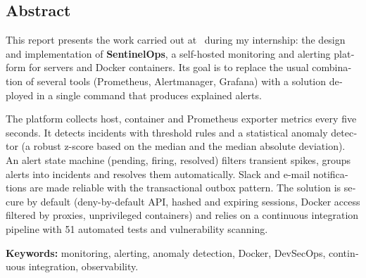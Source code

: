 \vspace{0.3cm}
\begin{otherlanguage}{english}
\section*{Abstract}
This report presents the work carried out at \entreprise\ during my internship: the design
and implementation of \textbf{SentinelOps}, a self-hosted monitoring and alerting platform for
servers and Docker containers. Its goal is to replace the usual combination of several tools
(Prometheus, Alertmanager, Grafana) with a solution deployed in a single command that
produces explained alerts.

The platform collects host, container and Prometheus exporter metrics every five seconds. It
detects incidents with threshold rules and a statistical anomaly detector (a robust z-score
based on the median and the median absolute deviation). An alert state machine (pending,
firing, resolved) filters transient spikes, groups alerts into incidents and resolves them
automatically. Slack and e-mail notifications are made reliable with the transactional
outbox pattern. The solution is secure by default (deny-by-default API, hashed and expiring
sessions, Docker access filtered by proxies, unprivileged containers) and relies on a
continuous integration pipeline with 51 automated tests and vulnerability scanning.

\medskip
\noindent\textbf{Keywords:} monitoring, alerting, anomaly detection, Docker, DevSecOps,
continuous integration, observability.
\end{otherlanguage}
